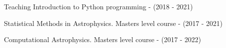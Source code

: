 \begin{rubric}{Teaching}
%
Introduction to Python programming - (2018 - 2021) \par
{}%
Statistical Methods in Astrophysics. Masters level course - (2017 - 2021) \par
{}%
Computational Astrophysics. Masters level course - (2017 - 2022) \par

 \par

%
%
\end{rubric}